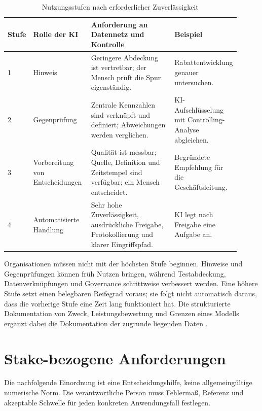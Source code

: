 \documentclass[a4paper,12pt,twoside]{report}
\theoremstyle{definition}
\begin{document}
\begin{table}[htbp]
\centering
\small
\caption{Nutzungsstufen nach erforderlicher Zuverlässigkeit}
\label{tab:reliability-levels}
\begin{tabular}{p{0.08\linewidth}p{0.25\linewidth}p{0.37\linewidth}p{0.21\linewidth}}
\toprule
\textbf{Stufe} & \textbf{Rolle der KI} & \textbf{Anforderung an Datennetz und Kontrolle} & \textbf{Beispiel} \\
\midrule
1 & Hinweis & Geringere Abdeckung ist vertretbar; der Mensch prüft die Spur eigenständig. & Rabattentwicklung genauer untersuchen. \\
2 & Gegenprüfung & Zentrale Kennzahlen sind verknüpft und definiert; Abweichungen werden verglichen. & KI-Aufschlüsselung mit Controlling-Analyse abgleichen. \\
3 & Vorbereitung von Entscheidungen & Qualität ist messbar; Quelle, Definition und Zeitstempel sind verfügbar; ein Mensch entscheidet. & Begründete Empfehlung für die Geschäftsleitung. \\
4 & Automatisierte Handlung & Sehr hohe Zuverlässigkeit, ausdrückliche Freigabe, Protokollierung und klarer Eingriffspfad. & KI legt nach Freigabe eine Aufgabe an. \\
\bottomrule
\end{tabular}
\end{table}

Organisationen müssen nicht mit der höchsten Stufe beginnen. Hinweise und Gegenprüfungen können früh Nutzen bringen, während Testabdeckung, Datenverknüpfungen und Governance schrittweise verbessert werden. Eine höhere Stufe setzt einen belegbaren Reifegrad voraus; sie folgt nicht automatisch daraus, dass die vorherige Stufe eine Zeit lang funktioniert hat. Die strukturierte Dokumentation von Zweck, Leistungsbewertung und Grenzen eines Modells ergänzt dabei die Dokumentation der zugrunde liegenden Daten \cite{modelcards19}.

\section{Stake-bezogene Anforderungen}
Die nachfolgende Einordnung ist eine Entscheidungshilfe, keine allgemeingültige numerische Norm. Die verantwortliche Person muss Fehlermaß, Referenz und akzeptable Schwelle für jeden konkreten Anwendungsfall festlegen.
\end{document}

